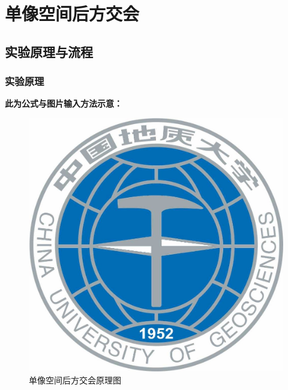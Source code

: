 


\cover
\thispagestyle{empty} %

\newpage
\tableofcontents
 \thispagestyle{empty} %

\newpage
\setcounter{page}{1} %

\section{单像空间后方交会}

\subsection{实验原理与流程}

\subsubsection{实验原理}
\textbf{此为公式与图片输入方法示意：}

\begin{figure}[!htbp]
	\centering
	\includegraphics[width=0.7\linewidth]{figures/cug.jpg}
	\caption{单像空间后方交会原理图}
	\label{fig:原理}
\end{figure}
\FloatBarrier

